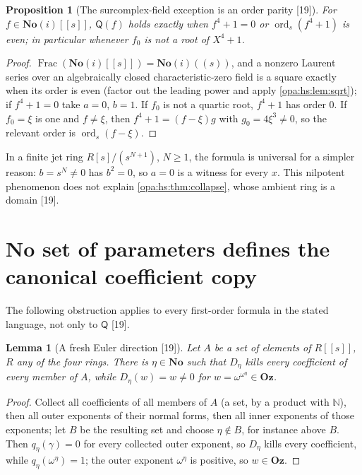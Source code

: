 \documentclass[11pt,oneside]{article}
\numberwithin{equation}{section}
\newtheorem{proposition}[proposition]{Proposition}
\newtheorem{lemma}[lemma]{Lemma}
\theoremstyle{definition}
\theoremstyle{remark}
\newcommand{\No}{\mathbf{No}}
\newcommand{\Oz}{\mathbf{Oz}}
\newcommand{\SC}{\mathbf{No}(i)}
\newcommand{\N}{\mathbb N}
\newcommand{\Frac}{\operatorname{Frac}}
\newcommand{\src}[1]{\textup{\textsf{\small[#1]}}}
\newcommand{\ord}{\operatorname{ord}}
\begin{document}
\begin{proposition}[The surcomplex-field exception is an order parity \src{19}]\label{opa:hs:prop:parity}
For $f\in\SC[[s]]$, $\mathsf Q(f)$ holds exactly when $f^4+1=0$ or $\ord_s(f^4+1)$ is even; in particular whenever $f_0$ is not a root of $X^4+1$.
\end{proposition}
\begin{proof}
$\Frac(\SC[[s]])=\SC((s))$, and a nonzero Laurent series over an algebraically closed characteristic-zero field is a square exactly when its order is even
(factor out the leading power and apply \cref{opa:hs:lem:sqrt}); if $f^4+1=0$ take $a=0$, $b=1$. If $f_0$ is not a quartic root, $f^4+1$ has order $0$. If
$f_0=\xi$ is one and $f\ne\xi$, then $f^4+1=(f-\xi)g$ with $g_0=4\xi^3\ne0$, so the relevant order is $\ord_s(f-\xi)$.
\end{proof}

In a finite jet ring $R[s]/(s^{N+1})$, $N\ge1$, the formula is universal for a simpler reason: $b=s^N\ne0$ has $b^2=0$, so $a=0$ is a witness for every $x$.
This nilpotent phenomenon does not explain \cref{opa:hs:thm:collapse}, whose ambient ring is a domain \src{19}.

\section{No set of parameters defines the canonical coefficient copy}\label{opa:hs:sec:nondef}

The following obstruction applies to every first-order formula in the stated language, not only to $\mathsf Q$ \src{19}.

\begin{lemma}[A fresh Euler direction \src{19}]\label{opa:hs:lem:fresh}
Let $A$ be a set of elements of $R[[s]]$, $R$ any of the four rings. There is $\eta\in\No$ such that $D_\eta$ kills every coefficient of every member of $A$,
while $D_\eta(w)=w\ne0$ for $w=\omega^{\omega^\eta}\in\Oz$.
\end{lemma}
\begin{proof}
Collect all coefficients of all members of $A$ (a set, by a product with $\N$), then all outer exponents of their normal forms, then all inner exponents
of those exponents; let $B$ be the resulting set and choose $\eta\notin B$, for instance above $B$. Then $q_\eta(\gamma)=0$ for every collected outer
exponent, so $D_\eta$ kills every coefficient, while $q_\eta(\omega^\eta)=1$; the outer exponent $\omega^\eta$ is positive, so $w\in\Oz$.
\end{proof}
\end{document}
